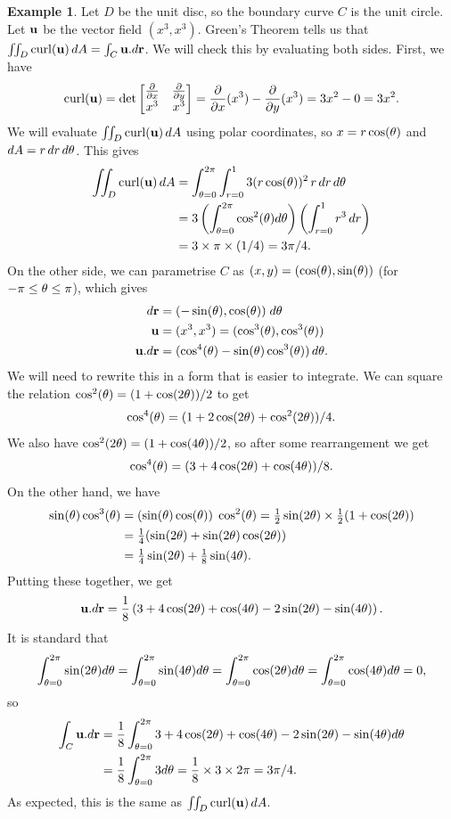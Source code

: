 \documentclass[reqno]{amsart}
\theoremstyle{definition}
\newtheorem{example}[theorem]{Example}
\begin{document}
\begin{example}
 Let $D$ be the unit disc, so the boundary curve $C$ is the unit circle. 
 Let $\mathbf{u}$ be the vector field $(x^3,x^3)$.  Green's Theorem tells us that
 $\iint_D\operatorname{curl}(\mathbf{u})\,dA=\int_C\mathbf{u}.d\mathbf{r}$.  We will check this by evaluating
 both sides.  First, we have
 \[ \operatorname{curl}(\mathbf{u}) = \det\left[\begin{matrix} \frac{\partial}{\partial x} & \frac{\partial}{\partial y} \\ x^3 & x^3 \end{matrix}\right] =
     \frac{\partial}{\partial x}(x^3)-\frac{\partial}{\partial y}(x^3) = 3x^2-0 = 3x^2.
 \]
 We will evaluate $\iint_D\operatorname{curl}(\mathbf{u})\,dA$ using polar coordinates, so
 $x=r\cos(\theta)$ and $dA=r\,dr\,d\theta$.  This gives
 \begin{align*}
  \iint_D \operatorname{curl}(\mathbf{u})\,dA 
   &= \int_{\theta=0}^{2\pi}\int_{r=0}^1 3(r\cos(\theta))^2\,r\,dr\,d\theta \\
   &= 3\left(\int_{\theta=0}^{2\pi}\cos^2(\theta)d\theta\right)
       \left(\int_{r=0}^1 r^3\,dr\right) \\
   &= 3\times \pi \times (1/4) = 3\pi/4.
 \end{align*}
 On the other side, we can parametrise $C$ as
 $(x,y)=(\cos(\theta),\sin(\theta))$ (for $-\pi\leq\theta\leq\pi$), which
 gives 
 \begin{align*}
  d\mathbf{r} &= (-\sin(\theta),\cos(\theta)) \; d\theta \\
  \mathbf{u} &= (x^3,x^3) = (\cos^3(\theta),\cos^3(\theta)) \\
  \mathbf{u}.d\mathbf{r} &= (\cos^4(\theta) - \sin(\theta)\cos^3(\theta))\,d\theta.
 \end{align*}
 We will need to rewrite this in a form that is easier to integrate.
 We can square the relation $\cos^2(\theta)=(1+\cos(2\theta))/2$ to get 
 \[ \cos^4(\theta) = (1+2\cos(2\theta)+\cos^2(2\theta))/4. \]
 We also have $\cos^2(2\theta)=(1+\cos(4\theta))/2$, so after some
 rearrangement we get 
 \[ \cos^4(\theta) = (3+4\cos(2\theta)+\cos(4\theta))/8. \]
 On the other hand, we have
 \begin{align*}
  \sin(\theta)\cos^3(\theta) 
   &= (\sin(\theta)\cos(\theta))\;\cos^2(\theta) 
    = \tfrac{1}{2}\sin(2\theta)\times \tfrac{1}{2}(1+\cos(2\theta)) \\
   &= \tfrac{1}{4}(\sin(2\theta)+\sin(2\theta)\cos(2\theta)) \\
   &= \tfrac{1}{4}\sin(2\theta) + \tfrac{1}{8}\sin(4\theta).
 \end{align*}
 Putting these together, we get
 \[ \mathbf{u}.d\mathbf{r} = 
     \frac{1}{8}\left(
      3+4\cos(2\theta)+\cos(4\theta)-2\sin(2\theta)-\sin(4\theta)
     \right).
 \] 
 It is standard that
 \[ \int_{\theta=0}^{2\pi} \sin(2\theta)d\theta = 
    \int_{\theta=0}^{2\pi} \sin(4\theta)d\theta = 
    \int_{\theta=0}^{2\pi} \cos(2\theta)d\theta = 
    \int_{\theta=0}^{2\pi} \cos(4\theta)d\theta = 0,
 \]
 so 
 \begin{align*}
  \int_C\mathbf{u}.d\mathbf{r} 
   &= \frac{1}{8}\int_{\theta=0}^{2\pi} 
        3+4\cos(2\theta)+\cos(4\theta)-2\sin(2\theta)-\sin(4\theta) d\theta \\
   &= \frac{1}{8}\int_{\theta=0}^{2\pi} 3 d\theta 
    = \frac{1}{8} \times 3 \times 2\pi = 3\pi/4.
 \end{align*}
 As expected, this is the same as $\iint_D\operatorname{curl}(\mathbf{u})\,dA$.
\end{example}
\end{document}
